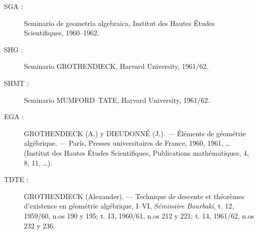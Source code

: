 \begin{description}
\item[SGA :] Seminario de geometría algebraica, Institut des Hautes Études
Scientifiques, 1960--1962.

\item[SHG :] Seminario GROTHENDIECK, Harvard University, 1961/62.

\item[SHMT :] Seminario MUMFORD--TATE, Harvard University, 1961/62.

\item[EGA :] GROTHENDIECK (A.) y DIEUDONNÉ (J.). --- Éléments de géométrie
algébrique. --- París, Presses universitaires de France, 1960, 1961, …
(Institut des Hautes Études Scientifiques, Publications mathématiques, 4, 8,
11, …).

\item[TDTE :] GROTHENDIECK (Alexander). --- Technique de descente et théorèmes
d'existence en géométrie algébrique, I--VI, \emph{Séminaire Bourbaki}, t. 12,
1959/60, n.os 190 y 195; t. 13, 1960/61, n.os 212 y 221; t. 14, 1961/62,
n.os 232 y 236.
\end{description}
